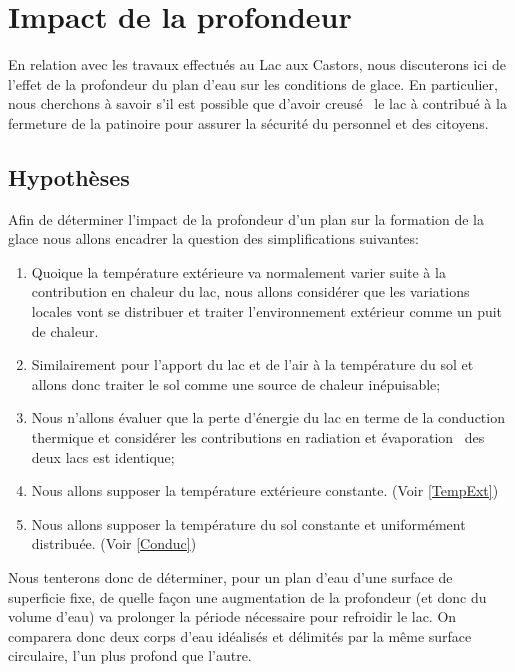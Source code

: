 \documentclass[12pt]{article}
\begin{document}
\section{Impact de la profondeur}

En relation avec les travaux effectu\'es au Lac aux Castors, nous discuterons ici de l'effet de la
profondeur du plan d'eau sur les conditions de glace. En particulier, nous cherchons \`a savoir s'il est
possible que d'avoir creus\'e~\cite{Lac} le lac \`a contribu\'e \`a la fermeture de la patinoire pour
assurer la s\'ecurit\'e du personnel et des citoyens.

\subsection{Hypoth\`eses}

Afin de d\'eterminer l'impact de la profondeur d'un plan sur la formation de la glace nous allons
encadrer la question des simplifications suivantes:

\begin{enumerate}
    \item Quoique la temp\'erature ext\'erieure va normalement varier suite \`a la contribution
        en chaleur du lac, nous allons consid\'erer que les variations locales vont se distribuer
        et traiter l'environnement ext\'erieur comme un puit de chaleur.
    \item Similairement pour l'apport du lac et de l'air \`a la temp\'erature du sol et allons
        donc traiter le sol comme une source de chaleur in\'epuisable;
    \item Nous n'allons \'evaluer que la perte d'\'energie du lac en terme de la conduction thermique
        et consid\'erer les contributions en radiation et \'evaporation~\cite{Evap} des deux lacs est
        identique;
    \item Nous allons supposer la temp\'erature ext\'erieure constante. (Voir \ref{TempExt})
    \item Nous allons supposer la temp\'erature du sol constante et uniform\'ement distribu\'ee.
        (Voir \ref{Conduc})
\end{enumerate}

Nous tenterons donc de d\'eterminer, pour un plan d'eau d'une surface de superficie fixe, de quelle fa\c
con une augmentation de la profondeur (et donc du volume d'eau) va prolonger la p\'eriode n\'ecessaire
pour refroidir le lac. On comparera donc deux corps d'eau id\'ealis\'es et d\'elimit\'es par la m\^eme
surface circulaire, l'un plus profond que l'autre.
\end{document}
